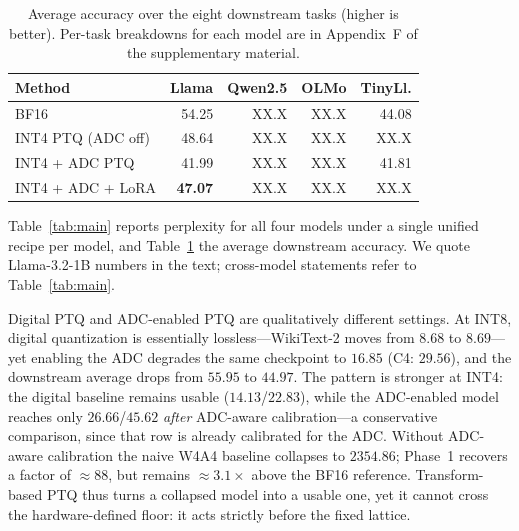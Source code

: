 \documentclass[letterpaper]{article} %
\theoremstyle{plain}
\newcommand{\phnum}{XX.X}
\begin{document}
\begin{table}[t]
\centering
\small
\setlength{\tabcolsep}{4pt}
\begin{tabular}{@{}l rrrr@{}}
\toprule
Method & Llama & Qwen2.5 & OLMo & TinyLl. \\
\midrule
BF16                     & 54.25 & \phnum & \phnum & 44.08 \\ %
INT4 PTQ (ADC off)       & 48.64 & \phnum & \phnum & \phnum \\ %
INT4 + ADC PTQ           & 41.99 & \phnum & \phnum & 41.81 \\ %
INT4 + ADC + LoRA        & \textbf{47.07} & \phnum & \phnum & \phnum \\ %
\bottomrule
\end{tabular}
\caption{Average accuracy over the eight downstream tasks (higher is better). Per-task breakdowns for each model are in Appendix~F of the supplementary material.}
\label{tab:downstream_avg}
\end{table}

Table~\ref{tab:main} reports perplexity for all four models under a single unified recipe per model, and Table~\ref{tab:downstream_avg} the average downstream accuracy. We quote Llama-3.2-1B numbers in the text; cross-model statements refer to Table~\ref{tab:main}.

Digital PTQ and ADC-enabled PTQ are qualitatively different settings. At INT8, digital quantization is essentially lossless---WikiText-2 moves from $8.68$ to $8.69$---yet enabling the ADC degrades the same checkpoint to $16.85$ (C4: $29.56$), and the downstream average drops from $55.95$ to $44.97$. The pattern is stronger at INT4: the digital baseline remains usable ($14.13$/$22.83$), while the ADC-enabled model reaches only $26.66$/$45.62$ \emph{after} ADC-aware calibration---a conservative comparison, since that row is already calibrated for the ADC. Without ADC-aware calibration the naive W4A4 baseline collapses to $2354.86$; Phase~1 recovers a factor of ${\approx}88$, but remains ${\approx}3.1\times$ above the BF16 reference. Transform-based PTQ thus turns a collapsed model into a usable one, yet it cannot cross the hardware-defined floor: it acts strictly before the fixed lattice.
\end{document}
